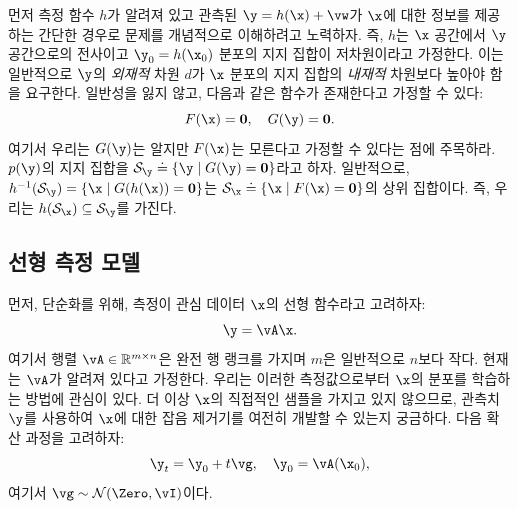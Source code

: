 \documentclass[../../book-main_ko.tex]{subfiles}
\begin{document}
먼저 측정 함수 $h$가 알려져 있고 관측된 $\y = h(\x) + \vw$가 $\x$에 대한 정보를 제공하는 간단한 경우로 문제를 개념적으로 이해하려고 노력하자. 즉, $h$는 $\x$ 공간에서 $\y$ 공간으로의 전사이고 $\y_0 = h(\x_0)$ 분포의 지지 집합이 저차원이라고 가정한다. 이는 일반적으로 $\y$의 \textit{외재적} 차원 $d$가 $\x$ 분포의 지지 집합의 \textit{내재적} 차원보다 높아야 함을 요구한다. 일반성을 잃지 않고, 다음과 같은 함수가 존재한다고 가정할 수 있다:
\begin{equation}
F(\x) = \boldsymbol{0},\quad     G(\y) = \boldsymbol{0}.
\end{equation}
여기서 우리는 $G(\y)$는 알지만 $F(\x)$는 모른다고 가정할 수 있다는 점에 주목하라. $p(\y)$의 지지 집합을 $\mathcal{S}_{\y} \doteq \{\y \mid G(\y) = \boldsymbol{0}\}$라고 하자. 일반적으로, $h^{-1}(\mathcal{S}_{\y}) = \{\x \mid G(h(\x)) = \boldsymbol{0}\}$는 $\mathcal{S}_{\x} \doteq \{\x \mid F(\x) = \boldsymbol{0}\}$의 상위 집합이다. 즉, 우리는 $h(\mathcal{S}_{\x}) \subseteq \mathcal{S}_{\y}$를 가진다.

\subsection{선형 측정 모델}
먼저, 단순화를 위해, 측정이 관심 데이터 $\x$의 선형 함수라고 고려하자:
\begin{equation}
    \y = \vA\x.
\end{equation}
여기서 행렬 $\vA \in \mathbb{R}^{m\times n}$은 완전 행 랭크를 가지며 $m$은 일반적으로 $n$보다 작다. 현재는 $\vA$가 알려져 있다고 가정한다. 우리는 이러한 측정값으로부터 $\x$의 분포를 학습하는 방법에 관심이 있다. 더 이상 $\x$의 직접적인 샘플을 가지고 있지 않으므로, 관측치 $\y$를 사용하여 $\x$에 대한 잡음 제거기를 여전히 개발할 수 있는지 궁금하다. 다음 확산 과정을 고려하자:
\begin{equation}
    \y_t = \y_0 + t \vg, \quad \y_0 = \vA(\x_0),
\end{equation}
여기서 $\vg \sim \mathcal{N}(\Zero, \vI)$이다.
\end{document}
